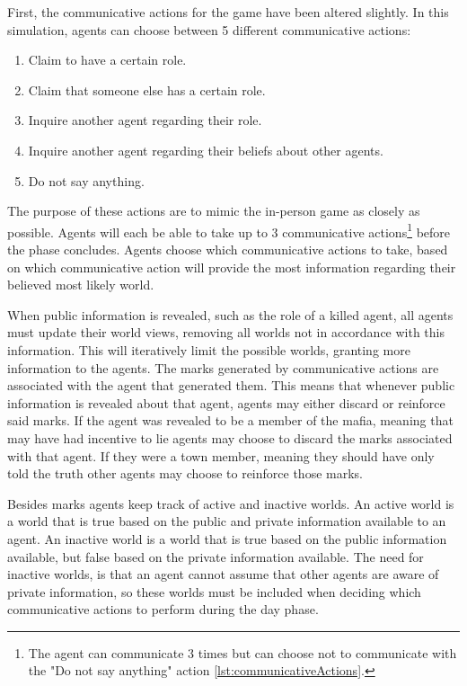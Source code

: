 First, the communicative actions for the game have been altered slightly. In
this simulation, agents can choose between 5 different communicative actions:
\begin{enumerate}
	\itemsep0px
	\item \label{Com}Claim to have a certain role.
	\item Claim that someone else has a certain role.
	\item Inquire another agent regarding their role.
	\item Inquire another agent regarding their beliefs about other agents.
	\item Do not say anything. \label{lst:communicativeActions}
\end{enumerate}
The purpose of these actions are to mimic the in-person game as closely as
possible. Agents will each be able to take up to 3 communicative actions\footnote{The agent can communicate 3 times but can choose not to communicate with the "Do not say anything" action \ref{lst:communicativeActions}.} before the
phase concludes. Agents choose which communicative actions to take, based on which communicative action
will provide the most information regarding their believed most likely world.

When public information is revealed, such as the role of a killed agent, all
agents must update their world views, removing all worlds not in accordance
with this information. This will iteratively limit the possible worlds,
granting more information to the agents. The marks generated by communicative
actions are associated with the agent that generated them. This means that
whenever public information is revealed about that agent, agents may either
discard or reinforce said marks. If the agent was revealed to be a member of
the mafia, meaning that may have had incentive to lie agents may choose to
discard the marks associated with that agent. If they were a town member,
meaning they should have only told the truth other agents may choose to
reinforce those marks.

Besides marks agents keep track of active and inactive worlds. An active world
is a world that is true based on the public and private information available
to an agent. An inactive world is a world that is true based on the public
information available, but false based on the private information available.
The need for inactive worlds, is that an agent cannot assume that other agents
are aware of private information, so these worlds must be included when
deciding which communicative actions to perform during the day phase.

